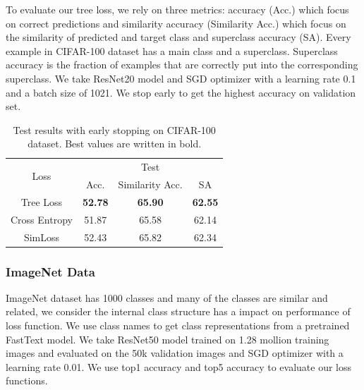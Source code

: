 \documentclass[twoside]{article}
\theoremstyle{definition}
\begin{document}
To evaluate our tree loss, we rely on three metrics: accuracy (Acc.) which focus on correct predictions and similarity accuracy (Similarity Acc.) which focus on the similarity of predicted and target class and superclass accuracy (SA). Every example in CIFAR-100 dataset has a main class and a superclass. Superclass accuracy is the fraction of examples that are correctly put into the corresponding superclass.
We take ResNet20 model \cite{He2016DeepRL} and SGD optimizer with a learning rate 0.1 and a batch size of 1021. 
We stop early to get the highest accuracy on validation set.


\begin{table}[]
\caption{Test results with early stopping on CIFAR-100 dataset. Best values are written in bold.} \label{cifar100}
\begin{center}
\begin{tabular}{@{}cccc@{}}
\toprule
\multirow{2}{*}{Loss} & \multicolumn{3}{c}{Test}    \\ \cmidrule(l){2-4} 
                      & Acc. & Similarity Acc. & SA \\ \cmidrule(r){1-1}
Tree Loss       & \textbf{52.78}     &  \textbf{65.90}               &  \textbf{62.55}  \\
Cross Entropy         &  51.87    &   65.58              &  62.14  \\
SimLoss               &    52.43  &    65.82             & 62.34  \\\bottomrule
\end{tabular}
\end{center}
\end{table}


\subsubsection{ImageNet Data}
ImageNet dataset \cite{Russakovsky2015ImageNetLS} has 1000 classes and many of the classes are similar and related, we consider the internal class structure has a impact on performance of loss function.
We use class names to get class representations from a pretrained FastText model.
We take ResNet50 model \cite{He2016DeepRL} trained on 1.28 mollion training images and evaluated on the 50k validation images and SGD optimizer with a learning rate 0.01.
We use top1 accuracy and top5 accuracy to evaluate our loss functions.
\end{document}
